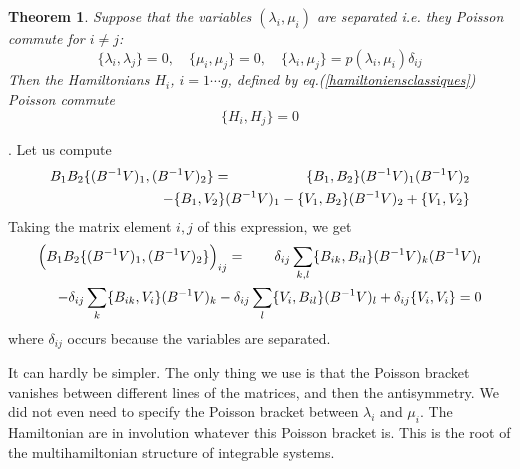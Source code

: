 \documentclass[a4paper,11pt]{article}
\newtheorem{theorem}{Theorem}
\def\proof{\noindent  {\underline {Proof}}. }
\def\square{ {\hfill \vrule height6pt width6pt depth1pt} \bigskip \medskip }
\begin{document}
\begin{theorem}
Suppose that the variables $(\lambda_i, \mu_i)$ are separated i.e. they Poisson commute for 
$i \neq j$:
\begin{equation}
\{ \lambda_i,\lambda_j\} = 0, \quad \{ \mu_i,\mu_j\}=0, \quad
\{ \lambda_i,\mu_j\} = p(\lambda_i, \mu_i) \delta_{ij}
\label{poisep}
\end{equation}
Then the Hamiltonians $H_i$, $i=1\cdots g$, defined by eq.(\ref{hamiltoniensclassiques}) Poisson commute
$$
\{ H_i , H_j \} = 0
$$
\end{theorem} 
\proof
Let us compute
\begin{eqnarray*}
B_1 B_2 \{ (B^{-1}V)_1,(B^{-1}V)_2 \} &=& 
\{ B_1, B_2 \}  (B^{-1}V)_1 (B^{-1}V)_2 \\
&& \hskip -2cm- \{ B_1, V_2 \}  (B^{-1}V)_1
- \{ V_1, B_2 \}  (B^{-1}V)_2
+  \{ V_1, V_2 \}
\end{eqnarray*}
Taking the matrix element $i,j$ of this expression, we get
\begin{eqnarray*}
\Big( B_1 B_2 \{ (B^{-1}V)_1,(B^{-1}V)_2 \}\Big)_{ij} &=& 
\delta_{ij}\sum_{k,l} \{ B_{ik}, B_{il} \}  (B^{-1}V)_k (B^{-1}V)_l \\
&& \hskip -5cm- \delta_{ij}\sum_k\{ B_{ik}, V_i \}  (B^{-1}V)_k
- \delta_{ij}\sum_l \{ V_i, B_{il} \}  (B^{-1}V)_l
+  \delta_{ij}\{ V_i, V_i \} =0
\end{eqnarray*}
where $\delta_{ij}$ occurs because the variables are separated.
\square

It can hardly be simpler. The only thing we use is that the Poisson bracket
vanishes between different lines of the matrices, and then the antisymmetry.
We did not even need to specify the Poisson bracket  between $\lambda_i$ and 
$\mu_i$. The Hamiltonian are in involution whatever this Poisson bracket is.
This is the root of the multihamiltonian structure of integrable systems.
\end{document}
